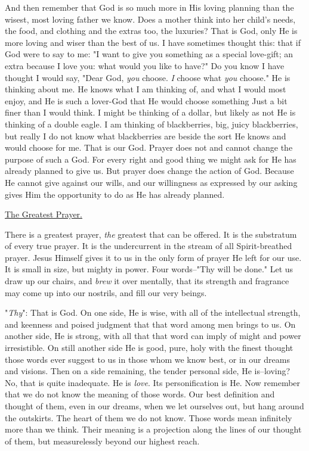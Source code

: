 And then remember that God is so much more in His loving planning than the
wisest, most loving father we know. Does a mother think into her child's
needs, the food, and clothing and the extras too, the luxuries? That is
God, only He is more loving and wiser than the best of us. I have
sometimes thought this: that if God were to say to me: "I want to give you
something as a special love-gift; an extra because I love you: what would
you like to have?" Do you know I have thought I would say, "Dear God,
\textit{you} choose. \textit{I} choose what \textit{you} choose." He is thinking about me. He
knows what I am thinking of, and what I would most enjoy, and He is such a
lover-God that He would choose something Just a bit finer than I would
think. I might be thinking of a dollar, but likely as not He is thinking
of a double eagle. I am thinking of blackberries, big, juicy blackberries,
but really I do not know what blackberries are beside the sort He knows
and would choose for me. That is our God. Prayer does not and cannot
change the purpose of such a God. For every right and good thing we might
ask for He has already planned to give us. But prayer does change the
action of God. Because He cannot give against our wills, and our
willingness as expressed by our asking gives Him the opportunity to do as
He has already planned.



\underline{The Greatest Prayer.}


There is a greatest prayer, \textit{the} greatest that can be offered. It is the
substratum of every true prayer. It is the undercurrent in the stream of
all Spirit-breathed prayer. Jesus Himself gives it to us in the only form
of prayer He left for our use. It is small in size, but mighty in power.
Four words--"Thy will be done." Let us draw up our chairs, and \textit{brew} it
over mentally, that its strength and fragrance may come up into our
nostrils, and fill our very beings.

"\textit{Thy}": That is God. On one side, He is wise, with all of the
intellectual strength, and keenness and poised judgment that that word
among men brings to us. On another side, He is strong, with all that that
word can imply of might and power irresistible. On still another side He
is good, pure, holy with the finest thought those words ever suggest to us
in those whom we know best, or in our dreams and visions. Then on a side
remaining, the tender personal side, He is--loving? No, that is quite
inadequate. He is \textit{love}. Its personification is He. Now remember that we
do not know the meaning of those words. Our best definition and thought of
them, even in our dreams, when we let ourselves out, but hang around the
outskirts. The heart of them we do not know. Those words mean infinitely
more than we think. Their meaning is a projection along the lines of our
thought of them, but measurelessly beyond our highest reach.

